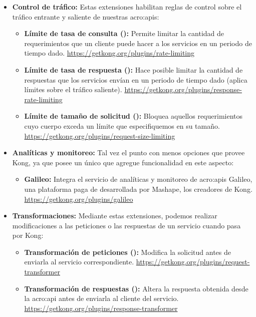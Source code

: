 \begin{itemize}
  \item \textbf{Control de tráfico:} Estas extensiones habilitan reglas de control sobre el tráfico entrante y saliente de nuestras \glspl{acro:api}:
  \begin{itemize}
    \item \textbf{Límite de tasa de consulta ():} Permite limitar la cantidad de requerimientos que un cliente puede hacer a los servicios en un periodo de tiempo dado. \url{https://getkong.org/plugins/rate-limiting}
    \item \textbf{Límite de tasa de respuesta ():} Hace posible limitar la cantidad de respuestas que los servicios envían en un periodo de tiempo dado (aplica límites sobre el tráfico saliente). \url{https://getkong.org/plugins/response-rate-limiting}
    \item \textbf{Límite de tamaño de solicitud ():} Bloquea aquellos requerimientos cuyo cuerpo exceda un límite que especifiquemos en su tamaño. \url{https://getkong.org/plugins/request-size-limiting}
  \end{itemize}

  \item \textbf{Analíticas y monitoreo:} Tal vez el punto con menos opciones que provee Kong, ya que posee un único  que agregue funcionalidad en este aspecto:
  \begin{itemize}
    \item \textbf{Galileo:} Integra el servicio de analíticas y monitoreo de \glspl{acro:api} Galileo, una plataforma paga de  desarrollada por Mashape, los creadores de Kong. \url{https://getkong.org/plugins/galileo}
  \end{itemize}

  \item \textbf{Transformaciones:} Mediante estas extensiones, podemos realizar modificaciones a las peticiones o las respuestas de un servicio cuando pasa por Kong:
  \begin{itemize}
    \item \textbf{Transformación de peticiones ():} Modifica la solicitud antes de enviarla al servicio correspondiente. \url{https://getkong.org/plugins/request-transformer}
    \item \textbf{Transformación de respuestas ():} Altera la respuesta obtenida desde la \gls{acro:api} antes de enviarla al cliente del servicio. \url{https://getkong.org/plugins/response-transformer}
  \end{itemize}


\end{itemize}
